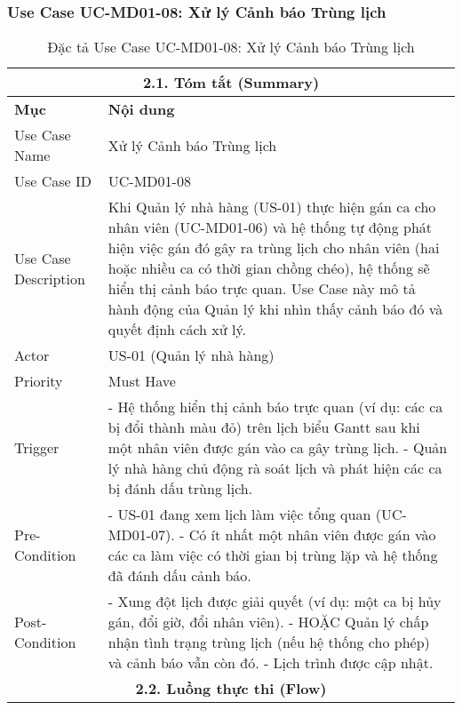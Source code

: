 \subsubsection{Use Case UC-MD01-08: Xử lý Cảnh báo Trùng lịch}

\begin{longtable}{|m{4cm}|p{11cm}|}
\caption{Đặc tả Use Case UC-MD01-08: Xử lý Cảnh báo Trùng lịch} \label{tab:uc_md01_08_revised} \\
\hline
\multicolumn{2}{|c|}{\textbf{2.1. Tóm tắt (Summary)}} \\
\hline
\textbf{Mục} & \textbf{Nội dung} \\
\hline
\endhead %
\hline
\endfoot %
\hline
\endlastfoot %
Use Case Name & Xử lý Cảnh báo Trùng lịch \\
\hline
Use Case ID & UC-MD01-08 \\
\hline
Use Case Description & Khi Quản lý nhà hàng (US-01) thực hiện gán ca cho nhân viên (UC-MD01-06) và hệ thống tự động phát hiện việc gán đó gây ra trùng lịch cho nhân viên (hai hoặc nhiều ca có thời gian chồng chéo), hệ thống sẽ hiển thị cảnh báo trực quan. Use Case này mô tả hành động của Quản lý khi nhìn thấy cảnh báo đó và quyết định cách xử lý. \\
\hline
Actor & US-01 (Quản lý nhà hàng) \\
\hline
Priority & Must Have \\
\hline
Trigger & - Hệ thống hiển thị cảnh báo trực quan (ví dụ: các ca bị đổi thành màu đỏ) trên lịch biểu Gantt sau khi một nhân viên được gán vào ca gây trùng lịch. \newline - Quản lý nhà hàng chủ động rà soát lịch và phát hiện các ca bị đánh dấu trùng lịch. \\
\hline
Pre-Condition & - US-01 đang xem lịch làm việc tổng quan (UC-MD01-07). \newline - Có ít nhất một nhân viên được gán vào các ca làm việc có thời gian bị trùng lặp và hệ thống đã đánh dấu cảnh báo. \\
\hline
Post-Condition & - Xung đột lịch được giải quyết (ví dụ: một ca bị hủy gán, đổi giờ, đổi nhân viên). \newline - HOẶC Quản lý chấp nhận tình trạng trùng lịch (nếu hệ thống cho phép) và cảnh báo vẫn còn đó. \newline - Lịch trình được cập nhật. \\
\hline
\multicolumn{2}{|c|}{\textbf{2.2. Luồng thực thi (Flow)}} \\

\end{longtable}
